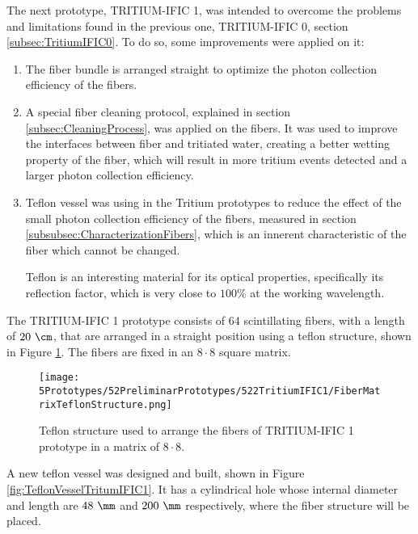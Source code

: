 The next prototype, TRITIUM-IFIC 1, was intended to overcome the problems and limitations found in the previous one, TRITIUM-IFIC 0, section \ref{subsec:TritiumIFIC0}. To do so, some improvements were applied on it:

\begin{enumerate}

\item{} The fiber bundle is arranged straight to optimize the photon collection efficiency of the fibers.

\item{} A special fiber cleaning protocol, explained in section \ref{subsec:CleaningProcess}, was applied on the fibers. It was used to improve the interfaces between fiber and tritiated water, creating a better wetting property of the fiber, which will result in more tritium events detected and a larger photon collection efficiency.

\item{}  Teflon vessel was using in the Tritium prototypes to reduce the effect of the small photon collection efficiency of the fibers, measured in section \ref{subsubsec:CharacterizationFibers}, which is an innerent characteristic of the fiber which cannot be changed.

Teflon is an interesting material for its optical properties, specifically its reflection factor, which is very close to $100\%$ at the working wavelength.

\end{enumerate}

The TRITIUM-IFIC 1 prototype consists of 64 scintillating fibers, with a length of $20~\cm$, that are arranged in a straight position using a teflon structure, shown in Figure \ref{fig:TeflonStructureFibersTritiumIFIC1}. The fibers are fixed in an $8\cdot{}8$ square matrix.

\begin{figure}[h]
\centering
\texttt{[image: 5Prototypes/52PreliminarPrototypes/522TritiumIFIC1/FiberMatrixTeflonStructure.png]}
\caption{Teflon structure used to arrange the fibers of TRITIUM-IFIC 1 prototype in a matrix of $8\cdot{}8$.\label{fig:TeflonStructureFibersTritiumIFIC1}}
\end{figure}

A new teflon vessel was designed and built, shown in Figure \ref{fig:TeflonVesselTritumIFIC1}. It has a cylindrical hole whose internal diameter and length are $48~\mm$ and $200~\mm$ respectively, where the fiber structure will be placed. 

